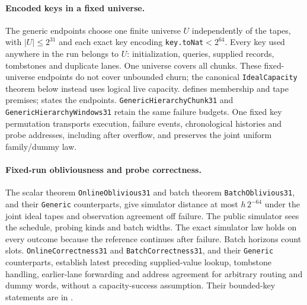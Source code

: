 \documentclass[11pt]{article}
\theoremstyle{definition}
\theoremstyle{remark}
\begin{document}
\paragraph{Encoded keys in a fixed universe.}
The generic endpoints choose one finite universe $U$ independently of the
tapes, with $|U|\le2^{31}$ and each exact key encoding \texttt{key.toNat}$<2^{64}$. Every key used anywhere
in the run belongs to $U$: initialization, queries, supplied records,
tombstones and duplicate lanes. One universe covers all chunks. These fixed-universe
endpoints do not cover unbounded churn; the canonical \texttt{IdealCapacity}
theorem below instead uses logical live capacity.
 defines membership and tape
premises;  states the endpoints.
\texttt{GenericHierarchyChunk31} and \texttt{GenericHierarchyWindows31}
retain the same failure budgets. One fixed key permutation transports
execution, failure events, chronological histories and probe addresses,
including after overflow, and preserves the joint uniform family/dummy law.

\paragraph{Fixed-run obliviousness and probe correctness.}
The scalar theorem \texttt{OnlineOblivious31} and batch theorem
\texttt{BatchOblivious31}, and their
\texttt{Generic} counterparts, give simulator distance at most $h\,2^{-64}$
under the joint ideal tapes and observation agreement off failure. The public
simulator sees the schedule, probing kinds and batch widths. The exact
simulator law holds on every outcome because the reference continues after
failure. Batch horizons count slots. \texttt{OnlineCorrectness31} and
\texttt{BatchCorrectness31}, and their \texttt{Generic} counterparts, establish
latest preceding supplied-value lookup, tombstone handling, earlier-lane
forwarding and address agreement for arbitrary routing and dummy words,
without a capacity-success assumption. Their bounded-key statements are in
.
\end{document}
